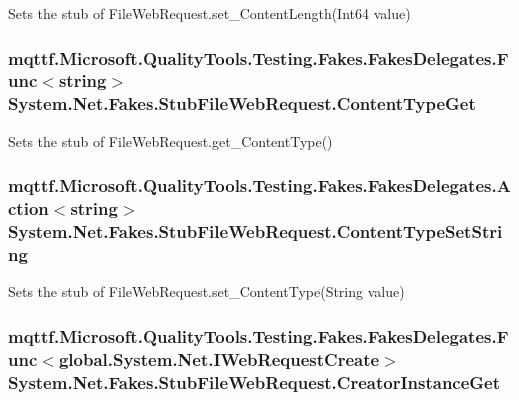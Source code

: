 Sets the stub of File\-Web\-Request.\-set\-\_\-\-Content\-Length(\-Int64 value)

\hypertarget{class_system_1_1_net_1_1_fakes_1_1_stub_file_web_request_a2855016c2c431666cc9d04caa7220830}{
\subsubsection[{Content\-Type\-Get}]{\setlength{\rightskip}{0pt plus 5cm}mqttf.\-Microsoft.\-Quality\-Tools.\-Testing.\-Fakes.\-Fakes\-Delegates.\-Func$<$string$>$ System.\-Net.\-Fakes.\-Stub\-File\-Web\-Request.\-Content\-Type\-Get}}\label{class_system_1_1_net_1_1_fakes_1_1_stub_file_web_request_a2855016c2c431666cc9d04caa7220830}


Sets the stub of File\-Web\-Request.\-get\-\_\-\-Content\-Type()

\hypertarget{class_system_1_1_net_1_1_fakes_1_1_stub_file_web_request_a567cebf037b3eb7f6c010064534c3c39}{
\subsubsection[{Content\-Type\-Set\-String}]{\setlength{\rightskip}{0pt plus 5cm}mqttf.\-Microsoft.\-Quality\-Tools.\-Testing.\-Fakes.\-Fakes\-Delegates.\-Action$<$string$>$ System.\-Net.\-Fakes.\-Stub\-File\-Web\-Request.\-Content\-Type\-Set\-String}}\label{class_system_1_1_net_1_1_fakes_1_1_stub_file_web_request_a567cebf037b3eb7f6c010064534c3c39}


Sets the stub of File\-Web\-Request.\-set\-\_\-\-Content\-Type(\-String value)

\hypertarget{class_system_1_1_net_1_1_fakes_1_1_stub_file_web_request_a9611aa8b24e4a039d14a3aa62a975e53}{
\subsubsection[{Creator\-Instance\-Get}]{\setlength{\rightskip}{0pt plus 5cm}mqttf.\-Microsoft.\-Quality\-Tools.\-Testing.\-Fakes.\-Fakes\-Delegates.\-Func$<$global.\-System.\-Net.\-I\-Web\-Request\-Create$>$ System.\-Net.\-Fakes.\-Stub\-File\-Web\-Request.\-Creator\-Instance\-Get}}\label{class_system_1_1_net_1_1_fakes_1_1_stub_file_web_request_a9611aa8b24e4a039d14a3aa62a975e53}


